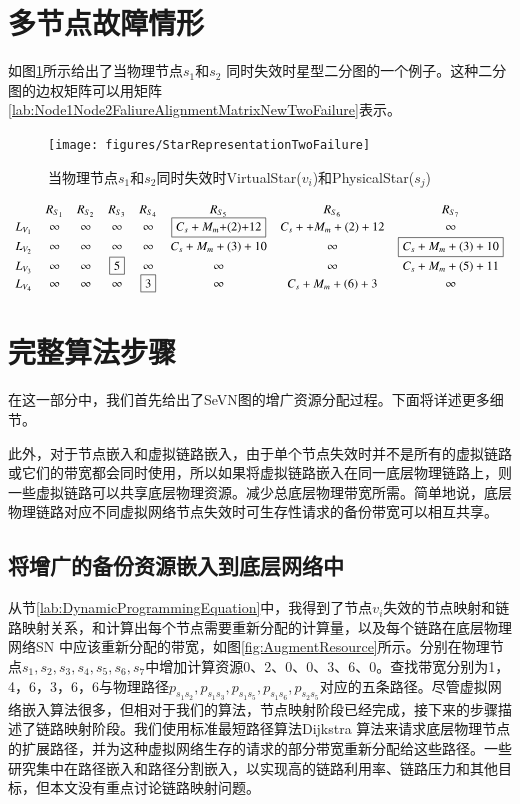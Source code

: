 \section{多节点故障情形}
\label{sec:multiplePhysicalNodeFailure}
如图\ref{fig:StarRepresentationTwoFailure}所示给出了当物理节点$s_1$和$s_2$ 同时失效时星型二分图的一个例子。这种二分图的边权矩阵可以用矩阵\ref{lab:Node1Node2FaliureAlignmentMatrixNewTwoFailure}表示。
\begin{figure}[htbp]
\centering
\texttt{[image: figures/StarRepresentationTwoFailure]}\\
  \caption{当物理节点$s_1$和$s_2$同时失效时VirtualStar($v_i$)和PhysicalStar($s_j$)}\label{fig:StarRepresentationTwoFailure}
\end{figure}
\begin{equation*}
\small{
 {\begin{array}{*{20}{c}}
&R_{S_1}&R_{S_2}&R_{S_3}&R_{S_4}&R_{S_5}&R_{S_6}&R_{S_{7}}\\
{L_{V_1}}&\infty&\infty&\infty&\infty&\fbox{$C_{s}+M_{m}$+(2)+12}&C_{s}++M_{m}+(2)+12&\infty\\
L_{V_2}&\infty&\infty&\infty&\infty&C_{s}+M_{m}+(3)+10&\infty&\fbox{$C_{s}+M_{m}+(3)+10$}\\
L_{V_3}&\infty&\infty&\fbox{5}&\infty&\infty&\infty&C_{s}+M_{m}+(5)+11\\
L_{V_4}&\infty&\infty&\infty&\fbox{3}&\infty&C_{s}+M_{m}+(6)+3&\infty\\
\end{array}}
}
\label{lab:Node1Node2FaliureAlignmentMatrixNewTwoFailure}
\end{equation*}
\section{完整算法步骤}
在这一部分中，我们首先给出了SeVN图的增广资源分配过程。下面将详述更多细节。

此外，对于节点嵌入和虚拟链路嵌入，由于单个节点失效时并不是所有的虚拟链路或它们的带宽都会同时使用，所以如果将虚拟链路嵌入在同一底层物理链路上，则一些虚拟链路可以共享底层物理资源。减少总底层物理带宽所需。简单地说，底层物理链路对应不同虚拟网络节点失效时可生存性请求的备份带宽可以相互共享。
\subsection{将增广的备份资源嵌入到底层网络中}

从节\ref{lab:DynamicProgrammingEquation}中，我得到了节点$v_i$失效的节点映射和链路映射关系，和计算出每个节点需要重新分配的计算量，以及每个链路在底层物理网络SN 中应该重新分配的带宽，如图\ref{fig:AugmentResource}所示。分别在物理节点$s_1,s_2,s_3,s_4,s_5,s_6,s_7$中增加计算资源0、2、0、0、3、6、0。查找带宽分别为1，4，6，3，6，6与物理路径$p_{s_1s_2},p_{s_1s_3},p_{s_1s_5},p_{s_1s_6},p_{s_2s_5}$对应的五条路径。尽管虚拟网络嵌入算法很多，但相对于我们的算法，节点映射阶段已经完成，接下来的步骤描述了链路映射阶段。我们使用标准最短路径算法Dijkstra 算法\cite{skiena1990dijkstra}来请求底层物理节点的扩展路径，并为这种虚拟网络生存的请求的部分带宽重新分配给这些路径。一些研究\cite{yu2008rethinking}集中在路径嵌入和路径分割嵌入，以实现高的链路利用率、链路压力和其他目标，但本文没有重点讨论链路映射问题。

